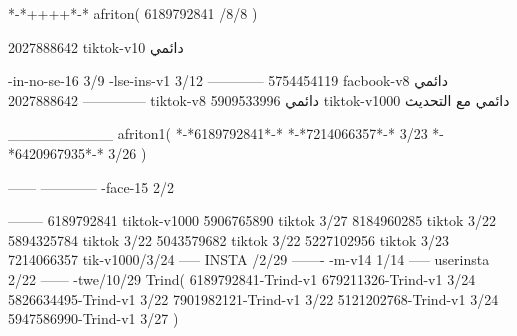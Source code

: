 *-*++++*-*
afriton(
6189792841 /8/8
)

2027888642 tiktok-v10
دائمي

-in-no-se-16 3/9
-lse-ins-v1 3/12
------------
5754454119 facbook-v8
دائمي
--------------
2027888642 tiktok-v8
دائمي
5909533996 tiktok-v1000
دائمي مع التحديث

__________
afriton1(
*-*6189792841*-*
*-*7214066357*-* 3/23
*-*6420967935*-* 3/26
)


------
------------
-face-15 2/2

--------
6189792841 tiktok-v1000
5906765890 tiktok 3/27
8184960285 tiktok 3/22
5894325784 tiktok 3/22
5043579682 tiktok 3/22
5227102956 tiktok 3/23
7214066357 tik-v1000/3/24
-----
 INSTA /2/29
-------
-m-v14 1/14
-----
userinsta 2/22
------
-twe/10/29
Trind(
6189792841-Trind-v1 
679211326-Trind-v1 3/24
5826634495-Trind-v1 3/22
7901982121-Trind-v1 3/22
5121202768-Trind-v1 3/24
5947586990-Trind-v1 3/27
)
